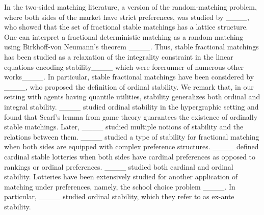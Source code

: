 In the two-sided matching literature, a version of the random-matching problem, where both sides of the market have strict preferences, was studied by ____, who showed that the set of fractional stable matchings has a lattice structure. One can interpret a fractional deterministic matching as a random matching using Birkhoff-von Neumann's theorem ____.  
Thus, stable fractional matchings has been studied as a relaxation of the integrality constraint in the linear equations encoding stability____ which were forerunner of numerous other works____.
In particular, stable fractional matchings have been considered by ____, who proposed the definition of ordinal stability. We remark that, in our setting with agents having quantile utilities, stability generalizes both ordinal and integral stability. ____ studied ordinal stability in the hypergraphic setting and found that Scarf’s lemma from game theory guarantees the existence of ordinally stable matchings.
Later, ____ studied multiple notions of stability and the relations between them.
____ studied a type of stability for fractional matching when both sides
are equipped with complex preference structures.
____ defined cardinal stable lotteries when both sides have cardinal preferences as opposed to rankings or ordinal preferences. ____ studied both cardinal and ordinal stability. 
Lotteries have been extensively studied for another application of matching under preferences, namely, the school choice problem ____. In particular, ____ studied ordinal stability, which they refer to as ex-ante stability.